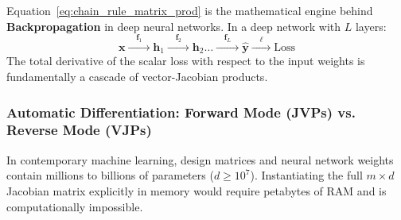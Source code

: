 Equation~\eqref{eq:chain_rule_matrix_prod} is the mathematical engine behind \textbf{Backpropagation} in deep neural networks. In a deep network with $L$ layers:
\begin{equation}
\mathbf{x} \xrightarrow{\quad\mathbf{f}_1\quad} \mathbf{h}_1 \xrightarrow{\quad\mathbf{f}_2\quad} \mathbf{h}_2 \dots \xrightarrow{\quad\mathbf{f}_L\quad} \hat{\mathbf{y}} \xrightarrow{\quad\ell\quad} \text{Loss}
\end{equation}
The total derivative of the scalar loss with respect to the input weights is fundamentally a cascade of vector-Jacobian products.

\subsubsection{Automatic Differentiation: Forward Mode (JVPs) vs. Reverse Mode (VJPs)}
In contemporary machine learning, design matrices and neural network weights contain millions to billions of parameters ($d \ge 10^7$). Instantiating the full $m \times d$ Jacobian matrix explicitly in memory would require petabytes of RAM and is computationally impossible.

